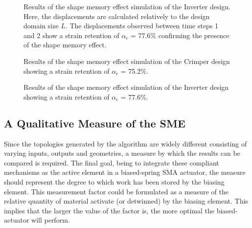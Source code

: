 \begin{figure}[hbt!]
    \centering
    
    \caption[Results of the shape memory effect simulation of the Inverter design]{Results of the shape memory effect simulation of the Inverter design. Here, the displacements are calculated relatively to the design domain size $L$. The displacements observed between time steps 1 and 2 show a strain retention of $\alpha_\epsilon$ = 77.6\% confirming the presence of the shape memory effect.}
    \label{fig:InverterAnsysSimu}
\end{figure}

\begin{figure}[hbt!]
    \centering
    
    \caption[Results of the shape memory effect simulation of the Crimper design]{Results of the shape memory effect simulation of the Crimper design showing a strain retention of $\alpha_\epsilon$ = 75.2\%.}
    \label{fig:CrimperAnsysSimu}
\end{figure}

\begin{figure}[hbt!]
    \centering
    
    \caption[Results of the shape memory effect simulation of the Inverter design]{Results of the shape memory effect simulation of the Inverter design showing a strain retention of $\alpha_\epsilon$ = 77.6\%.}
    \label{fig:GripperAnsysSimu}
\end{figure}

\subsection{A Qualitative Measure of the SME}
Since the topologies generated by the algorithm are widely different consisting of varying inputs, outputs and geometries, a measure by which the results can be compared is required. The final goal, being to integrate these compliant mechanisms as the active element in a biased-spring SMA actuator, the measure should represent the degree to which work has been stored by the biasing element. This measurement factor could be formulated as a measure of the relative quantity of material activate (or detwinned) by the biasing element. This implies that the larger the value of the factor is, the more optimal the biased-actuator will perform.

